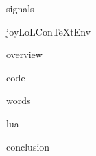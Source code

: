 
\usemodule[t-diSimp]

\startDiSimpComponent signals

\diSimpEnvironment joyLoLConTeXtEnv

\startJoyLoLCoAlg[title=Internal Signals][signals]

\diSimpComponent overview

\diSimpComponent code

\diSimpComponent words

\diSimpComponent lua

\diSimpComponent conclusion

\stopJoyLoLCoAlg

\stopDiSimpComponent
